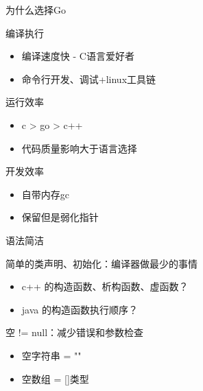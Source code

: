 \documentclass{beamer}
\begin{document}
\begin{frame}[t]{为什么选择Go}
    \begin{itemize}
         {
            \item 编译执行
                \begin{itemize}
                    \item 编译速度快 - C语言爱好者
                    \item 命令行开发、调试+linux工具链
                \end{itemize}
            \item 运行效率
                \begin{itemize}
                    \item c > go > c++
                    \item 代码质量影响大于语言选择
                \end{itemize}
            \item 开发效率
                \begin{itemize}
                    \item 自带内存gc
                    \item 保留但是弱化指针
                \end{itemize}
        }
         {
            \item 语法简洁
                \begin{itemize}
                     {
                        \item 简单的类声明、初始化：编译器做最少的事情
                             {
                                \begin{itemize}
                                    \item c++ 的构造函数、析构函数、虚函数？
                                    \item java 的构造函数执行顺序？
                                \end{itemize}
                            }
                        \item 空 != null：减少错误和参数检查
                             {
                                \begin{itemize}
                                    \item 空字符串 = ""
                                    \item 空数组 = []类型
                                \end{itemize}
                            }
}
\end{itemize}}
\end{itemize}
\end{frame}
\end{document}
